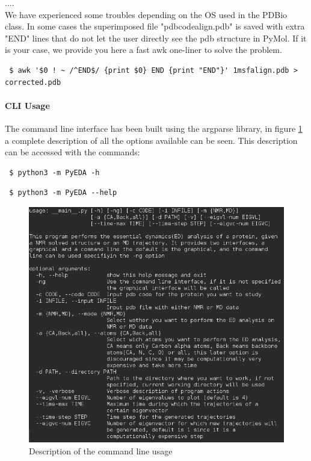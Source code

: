 \documentclass[12pt]{article}
\begin{document}
 ....\\
 
 We have experienced some troubles depending on the OS used in the PDBio class. In some cases the superimposed file "pdbcodealign.pdb" is saved with extra "END" lines that do not let the user directly see the pdb structure in PyMol. If it is your case, we provide you here a fast awk one-liner to solve the problem. 
 \begin{lstlisting}
 $ awk '$0 ! ~ /^END$/ {print $0} END {print "END"}' 1msfalign.pdb > corrected.pdb
 \end{lstlisting}
 \paragraph{CLI Usage}
 The command line interface has been built using the argparse library, in figure \ref{fig:usage} a complete description of all the options available can be seen. This description can be accessed with the commands:
 \begin{lstlisting}
 $ python3 -m PyEDA -h 
 \end{lstlisting}
 \begin{lstlisting}
 $ python3 -m PyEDA --help
 \end{lstlisting}
 \begin{figure}[h]
 \centering
 \includegraphics[scale=0.4]{usage.png}
 \caption{Description of the command line usage}
 \label{fig:usage}
 \end{figure}
 
\end{document}
